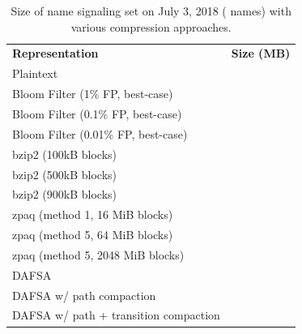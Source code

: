 \begin{table}[t]
  \centering
  \caption{Size of \ac{name} signaling set on July 3, 2018 (\numnames{} names)
  with various compression approaches.}
  \begin{tabularx}{\linewidth}{|Xr|}
    \toprule
    \textbf{Representation} & \textbf{Size (MB)} \\
    Plaintext & \plaintextsize \\
    Bloom Filter (1\% FP, best-case) & \bloomlargesize \\
    Bloom Filter (0.1\% FP, best-case) & \bloommedsize \\
    Bloom Filter (0.01\% FP, best-case) & \bloomsmallsize \\
    bzip2 (100kB blocks) & \bzlargesize \\
    bzip2 (500kB blocks) & \bzmedsize \\
    bzip2 (900kB blocks) & \bzsmallsize \\
    zpaq (method 1, 16 MiB blocks) & \zpaqlargesize \\
    zpaq (method 5, 64 MiB blocks) & \zpaqmedsize \\
    zpaq (method 5, 2048 MiB blocks) & \zpaqsmallsize \\
    DAFSA & \fsalargesize \\
    DAFSA w/ path compaction & \fsamedsize \\
    DAFSA w/ path + transition compaction & \fsasmallsize \\




    \bottomrule

  \end{tabularx}
  \label{tab:op-costs}
\end{table}


